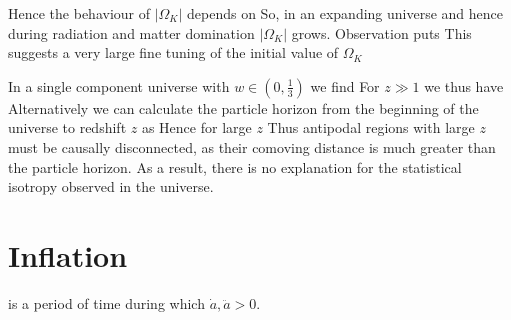 \documentclass{article}
\begin{document}
\begin{example}\label{example:CSM:curvature problem}
Hence the behaviour of $|\Omega_K|$ depends on 
So, in an expanding universe 
and hence during radiation and matter domination $|\Omega_K|$ grows. Observation puts 
This suggests a very large fine tuning of the initial value of $\Omega_K$
\end{example}

\begin{example}\label{example:CSM:horizon problem}
In a single component universe with $w\in(0,\frac{1}{3})$ we find 
For $z\gg1$ we thus have 
Alternatively we can calculate the particle horizon from the beginning of the universe to redshift $z$ as 
Hence for large $z$
Thus antipodal regions with large $z$ must be causally disconnected, as their comoving distance is much greater than the particle horizon. As a result, there is no explanation for the statistical isotropy observed in the universe. 
\end{example}

\section{Inflation}

\begin{definition}[Inflation]
 is a period of time during which $\dot{a},\ddot{a} > 0$. 
\end{definition}
\end{document}
